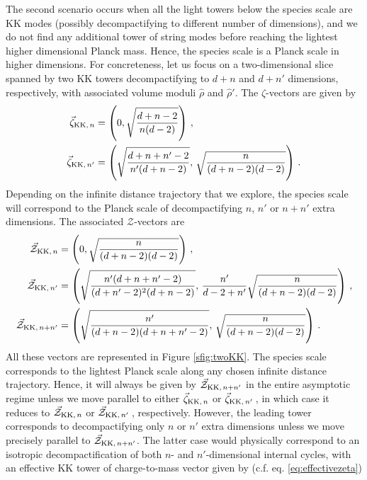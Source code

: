 The second scenario occurs when all the light towers below the species scale are KK modes (possibly decompactifying to different number of dimensions), and we do not find any additional tower of string modes before reaching the lightest higher dimensional Planck mass. Hence, the species scale is a Planck scale in higher dimensions. For concreteness, let us focus on a two-dimensional slice spanned by two KK towers decompactifying to $d+n$ and $d+n'$ dimensions, respectively, with associated volume moduli $\hat{\rho}$ and $\hat{\rho}'$. The $\zeta$-vectors are given by \cite{Etheredge:2022opl} 
%
\begin{equation}\label{eq:n&n'zetas}
	\begin{split} 
		\vec{\zeta}_{{\rm KK},\, n} &= \left( 0 , \sqrt{\frac{d+n-2}{n (d-2)}} \right)\, ,\\
		\vec{\zeta}_{{\rm KK},\, n'} &= \left( \sqrt{\frac{d+n+n'-2}{n' (d+n-2)}} ,\, \sqrt{\frac{n}{(d+n-2)(d-2)}} \right)\, .
	\end{split}
\end{equation}
%
Depending on the infinite distance trajectory that we explore, the species scale will correspond to the Planck scale of decompactifying $n$, $n'$ or $n+n'$ extra dimensions. The associated $\mathcal{Z}$-vectors are
%
\begin{equation}
	\begin{split} 
		\vec{\mathcal{Z}}_{{\rm KK},\, n} &= \left( 0 , \sqrt{\frac{n}{(d+n-2) (d-2)}} \right) \, ,\\
		\vec{\mathcal{Z}}_{{\rm KK},\, n'} &= \left( \sqrt{\frac{n'(d+n+n'-2)}{(d+n'-2)^2 (d+n-2)}} ,\, \frac{n'}{d-2+n'} \sqrt{\frac{n}{(d+n-2) (d-2)}} \right) \, ,\\
		\vec{\mathcal{Z}}_{{\rm KK},\, n+ n'} &= \left( \sqrt{\frac{n'}{(d+n-2) (d+n+n'-2)}},\, \sqrt{\frac{n}{(d+n-2) (d-2)}} \right) \, \label{eq:combinedZ}.
	\end{split}
\end{equation}
%
All these vectors are represented in Figure \ref{sfig:twoKK}. The species scale corresponds to the lightest Planck scale along any chosen infinite distance trajectory. Hence, it will always be given by $\vec{\mathcal{Z}}_{{\rm KK},\,  n+ n'}$ in the entire asymptotic regime unless we move parallel to either $\vec{\zeta}_{{\rm KK},\, n}$ or $\vec{\zeta}_{{\rm KK},\, n'}\,$, in which case it reduces to $\vec{\mathcal{Z}}_{{\rm KK},\, n}$ or $\vec{\mathcal{Z}}_{{\rm KK},\, n'}\,$, respectively. However, the leading tower corresponds to decompactifying only $n$ or $n'$ extra dimensions unless we move precisely parallel to $\vec{\mathcal{Z}}_{{\rm KK},\,  n+ n'}$. The latter case would physically correspond to an isotropic decompactification of both $n$- and $n'$-dimensional internal cycles, with an effective KK tower of charge-to-mass vector given by (c.f. eq. \eqref{eq:effectivezeta})
